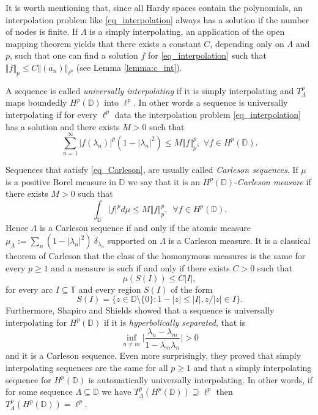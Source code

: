 \documentclass{amsart}
\numberwithin{equation}{section}
\begin{document}
It is worth mentioning that, since all Hardy spaces contain the polynomials, an interpolation problem like \eqref{eq_interpolation} always has a solution if the number of nodes is finite.  If $\Lambda$ is a simply interpolating, an application of the open mapping theorem yields that there exists a constant $C$, depending only on $\Lambda$ and $p$, such that one can find a solution $f$ for \eqref{eq_interpolation} such that $\Vert f \Vert_p \leq C \Vert (a_n) \Vert_{\ell^p}$ (see Lemma \ref{lemma:c_int}). 

A sequence is called {\it universally interpolating} if it is simply interpolating and $T_\Lambda^p$ maps boundedly $H^p(\mathbb{D})$ into $\ell^p.$ 
In other words a sequence is universally interpolating if for every $\ell^p$ data 
the interpolation problem \eqref{eq_interpolation} has a solution and there exists 
$M>0$ such that 
\begin{equation} \label{eq_Carleson} \sum_{n=1}^{\infty} |f(\lambda_n)|^p(1-|\lambda_n|^2) \leq M \Vert f\Vert^p_p, \,\, \forall f\in H^p(\mathbb{D}).  
\end{equation}

Sequences that satisfy \eqref{eq_Carleson}, are usually called {\it Carleson sequences}. 
If $\mu$ is a positive Borel measure in $\mathbb{D}$  we say that it is an $H^p(\mathbb{D})$-{\it Carleson measure} if there exists $M>0$ such that 
\begin{equation}
	\int_\mathbb{D}|f|^p d\mu \leq M \Vert f\Vert^p_p, \,\,\, \forall f \in H^p(\mathbb{D}).
\end{equation}
Hence $\Lambda$ is a Carleson sequence if and only if the atomic measure $\mu_\Lambda:=\sum_n(1-|\lambda_n|^2)~\delta_{\lambda_n}$
supported on $\Lambda$ is a Carleson measure.
It is a classical theorem of Carleson that the class of the homonymous measures is the same for every $p \geq 1 $ and a measure is such if and only if there exists $C>0$ such that 
\begin{equation}\label{eq:one_box} \mu(S(I)) \leq C |I|, \end{equation}
for every arc $I\subseteq \mathbb{T}$ and every region $S(I)$ of the form 
\[ S(I) = \{ z\in \mathbb{D}\setminus\{0\} : 1-|z| \leq |I|, z/|z| \in I \}. \]
Furthermore, Shapiro and Shields showed that a sequence is universally interpolating for $H^p(\mathbb{D})$ if it is {\it hyperbolically separated}, that is 
\begin{equation*}
	\inf_{n \neq m} \Big| \frac{\lambda_n-\lambda_m}{1-\overline{\lambda_m}\lambda_n} \Big|>0
\end{equation*}
and it is a Carleson sequence. Even more surprisingly, they proved that simply interpolating sequences are the same for all $p\ge1$ and that a simply interpolating sequence for $H^p(\mathbb{D})$  is automatically universally interpolating. In other words, if for some sequence $\Lambda \subseteq \mathbb{D}$ we have $T_\Lambda^p(H^p(\mathbb{D})) \supseteq \ell^p $ then $T_\Lambda^p(H^p(\mathbb{D})) = \ell^p. $     
\end{document}
